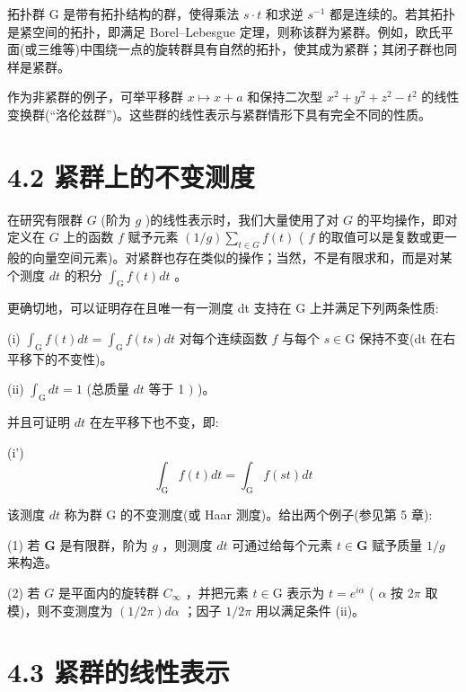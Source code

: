 \documentclass[10pt]{article}
\begin{document}
拓扑群 G 是带有拓扑结构的群，使得乘法 \(s \cdot  t\) 和求逆 \({s}^{-1}\) 都是连续的。若其拓扑是紧空间的拓扑，即满足 Borel–Lebesgue 定理，则称该群为紧群。例如，欧氏平面(或三维等)中围绕一点的旋转群具有自然的拓扑，使其成为紧群；其闭子群也同样是紧群。

作为非紧群的例子，可举平移群 \(x \mapsto  x + a\) 和保持二次型 \({x}^{2} + {y}^{2} + {z}^{2} - {t}^{2}\) 的线性变换群(“洛伦兹群”)。这些群的线性表示与紧群情形下具有完全不同的性质。

\section*{4.2 紧群上的不变测度}

在研究有限群 \(G\) (阶为 \(g\) )的线性表示时，我们大量使用了对 \(G\) 的平均操作，即对定义在 \(G\) 上的函数 \(f\) 赋予元素 \(\left( {1/g}\right) \mathop{\sum }\limits_{{t \in  G}}f\left( t\right)\) ( \(f\) 的取值可以是复数或更一般的向量空间元素)。对紧群也存在类似的操作；当然，不是有限求和，而是对某个测度 \({dt}\) 的积分 \({\int }_{\mathrm{G}}f\left( t\right) {dt}\) 。

更确切地，可以证明存在且唯一有一测度 dt 支持在 G 上并满足下列两条性质:

(i) \({\int }_{\mathrm{G}}f\left( t\right) {dt} = {\int }_{\mathrm{G}}f\left( {ts}\right) {dt}\) 对每个连续函数 \(f\) 与每个 \(s \in  \mathrm{G}\) 保持不变(dt 在右平移下的不变性)。

(ii) \({\int }_{\mathrm{G}}{dt} = 1\) (总质量 \({dt}\) 等于 1 \()\) )。

并且可证明 \({dt}\) 在左平移下也不变，即:

(i')
\[
{\int }_{\mathrm{G}}f\left( t\right) {dt} = {\int }_{\mathrm{G}}f\left( {st}\right) {dt}
\]

该测度 \({dt}\) 称为群 G 的不变测度(或 Haar 测度)。给出两个例子(参见第 5 章):

(1) 若 \(\mathbf{G}\) 是有限群，阶为 \(g\) ，则测度 \({dt}\) 可通过给每个元素 \(t \in  \mathbf{G}\) 赋予质量 \(1/g\) 来构造。

(2) 若 \(G\) 是平面内的旋转群 \({C}_{\infty }\) ，并把元素 \(t \in  \mathrm{G}\) 表示为 \(t = {e}^{i\alpha }\) ( \(\alpha\) 按 \({2\pi }\) 取模)，则不变测度为 \(\left( {1/{2\pi }}\right) {d\alpha }\) ；因子 \(1/{2\pi }\) 用以满足条件 (ii)。

\section*{4.3 紧群的线性表示}
\end{document}
